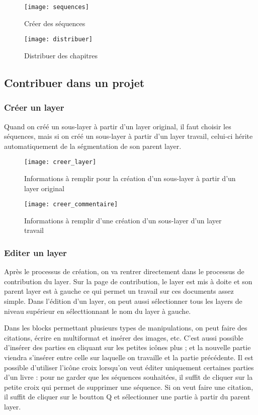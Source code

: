 \begin{figure}[H]
\centering
\texttt{[image: sequences]}
\caption{Créer des séquences}
\end{figure}

\begin{figure}[H]
\centering
\texttt{[image: distribuer]}
\caption{Distribuer des chapitres}
\end{figure}

\subsection{Contribuer dans un projet}

\subsubsection{Créer un layer}

Quand on créé un sous-layer à partir d'un layer original, il faut choisir les séquences, mais si on créé un sous-layer à partir d'un layer travail, celui-ci hérite automatiquement de la ségmentation de son parent layer.

\begin{figure}[H]
\centering
\texttt{[image: creer\_layer]}
\caption{Informations à remplir pour la création d'un sous-layer à partir d'un layer original}
\end{figure}

\begin{figure}[H]
\centering
\texttt{[image: creer\_commentaire]}
\caption{Informations à remplir d'une création d'un sous-layer d'un layer travail}
\end{figure}

\subsubsection{Editer un layer}

Après le processus de création, on va rentrer directement dans le processus de contribution du layer. Sur la page de contribution, le layer est mis à doite et son parent layer est à gauche ce qui permet un travail sur ces documents assez simple. Dans l'édition d'un layer, on peut aussi sélectionner tous les layers de niveau supérieur en sélecttionnant le nom du layer à gauche.

Dans les blocks permettant plusieurs types de manipulations, on peut faire des citations, écrire en multiformat et insérer des images, etc. C'est aussi possible d'insérer des parties en cliquant sur les petites icônes plus ; et la nouvelle partie viendra s'insérer entre celle sur laquelle on travaille et la partie précédente. Il est possible d'utiliser l'icône croix lorsqu'on veut éditer uniquement certaines parties d'un livre : pour ne garder que les séquences souhaitées, il suffit de cliquer sur la petite croix qui permet de supprimer une séquence. Si on veut faire une citation, il suffit de cliquer sur le boutton Q et sélectionner une partie à partir du parent layer.


